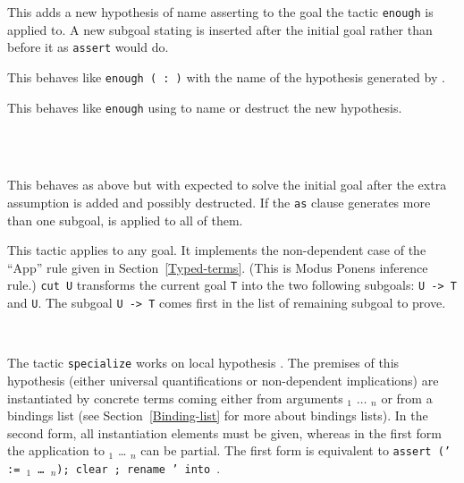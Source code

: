 \begin{Variants}
\item {}

  This adds a new hypothesis of name {\ident} asserting {\form} to the
  goal the tactic \texttt{enough} is applied to. A new subgoal stating
  \texttt{\form} is inserted after the initial goal rather than before
  it as \texttt{assert} would do.

\item {}

  This behaves like \texttt{enough ({\ident} :\ {\form})} with the name
  {\ident} of the hypothesis generated by {\Coq}.

\item {}

  This behaves like \texttt{enough} {\form} using {\intropattern} to
  name or destruct the new hypothesis.

\item {}\\
 {}\\
 {}

  This behaves as above but with {\tac} expected to solve the initial
  goal after the extra assumption {\form} is added and possibly
  destructed. If the \texttt{as} {\intropattern} clause generates more
  than one subgoal, {\tac} is applied to all of them.

\item {}

  This tactic applies to any goal. It implements the non-dependent
  case of the ``App'' rule given in
  Section~\ref{Typed-terms}. (This is Modus Ponens inference rule.)
  {\tt cut U} transforms the current goal \texttt{T} into the two
  following subgoals: {\tt U -> T} and \texttt{U}.  The subgoal {\tt U
    -> T} comes first in the list of remaining subgoal to prove.

\item {} \\
      {}

      The tactic {\tt specialize} works on local hypothesis \ident.
      The premises of this hypothesis (either universal
      quantifications or non-dependent implications) are instantiated
      by concrete terms coming either from arguments \term$_1$
      $\ldots$ \term$_n$ or from a bindings list (see
      Section~\ref{Binding-list} for more about bindings lists). In the
      second form, all instantiation elements must be given, whereas
      in the first form the application to \term$_1$ {\ldots}
      \term$_n$ can be partial. The first form is equivalent to
      {\tt assert (\ident' := {\ident} {\term$_1$} \dots\ \term$_n$);
           clear \ident; rename \ident' into \ident}.


\end{Variants}
